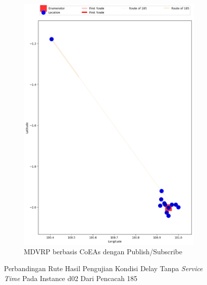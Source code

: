 \begin{figure}[H]\ContinuedFloat
	\centering
	\begin{subfigure}[t]{\textwidth}
		\centering
		\includegraphics[width=\textwidth]{Resources/Images/delayed_2/real_m15_n100_delayed_2_185_pubsub_coes}
		\caption{MDVRP berbasis CoEAs dengan Publish/Subscribe}
		\label{fig:real_m15_n100_delayed_2_185_pubsub_coes}
	\end{subfigure}
	\caption{Perbandingan Rute Hasil Pengujian Kondisi Delay Tanpa \textit{Service Time} Pada Instance d02 Dari Pencacah 185}
	\label{fig:real_m15_n100_delayed_2_185_contd}
\end{figure}


